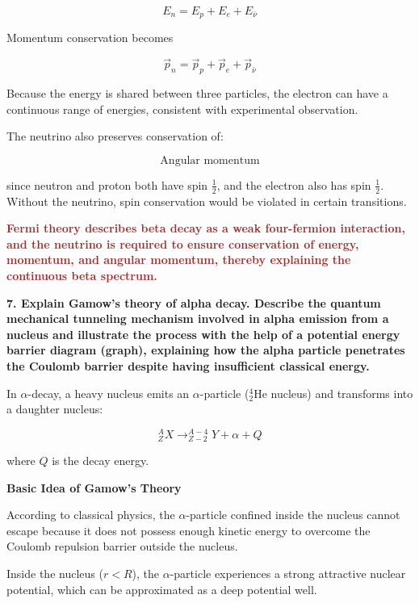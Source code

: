 \documentclass[a4paper, 12pt]{article}
\begin{document}
\[
E_n = E_p + E_e + E_{\bar{\nu}}
\]

Momentum conservation becomes

\[
\vec{p}_n = \vec{p}_p + \vec{p}_e + \vec{p}_{\bar{\nu}}
\]

Because the energy is shared between three particles, the electron can have a continuous range of energies, consistent with experimental observation.

The neutrino also preserves conservation of:

\[
\text{Angular momentum}
\]

since neutron and proton both have spin $\frac{1}{2}$, and the electron also has spin $\frac{1}{2}$. 
Without the neutrino, spin conservation would be violated in certain transitions.

\vspace{0.4cm}

\textcolor{brown}{\textbf{Fermi theory describes beta decay as a weak four-fermion interaction, and the neutrino is required to ensure conservation of energy, momentum, and angular momentum, thereby explaining the continuous beta spectrum.}}

\textbf{7. Explain Gamow's theory of alpha decay. Describe the quantum mechanical tunneling mechanism involved in alpha emission from a nucleus and illustrate the process with the help of a potential energy barrier diagram (graph), explaining how the alpha particle penetrates the Coulomb barrier despite having insufficient classical energy.}

\vspace{0.3cm}

In $\alpha$-decay, a heavy nucleus emits an $\alpha$-particle ($^4_2\text{He}$ nucleus) and transforms into a daughter nucleus:

\[
^{A}_{Z}X \rightarrow ^{A-4}_{Z-2}Y + \alpha + Q
\]

where $Q$ is the decay energy.

\vspace{0.4cm}

\textbf{Basic Idea of Gamow's Theory}

According to classical physics, the $\alpha$-particle confined inside the nucleus cannot escape because it does not possess enough kinetic energy to overcome the Coulomb repulsion barrier outside the nucleus.

Inside the nucleus ($r<R$), the $\alpha$-particle experiences a strong attractive nuclear potential, which can be approximated as a deep potential well.
\end{document}
